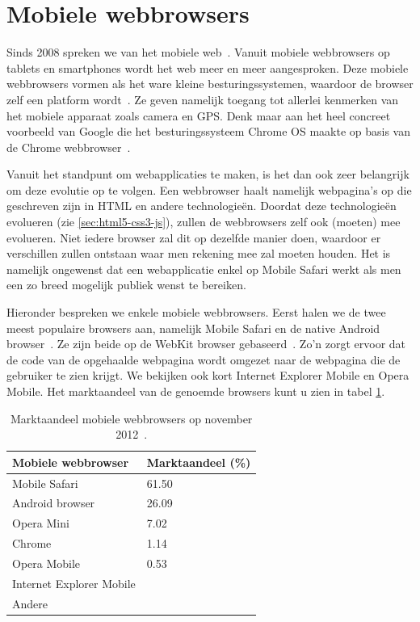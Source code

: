 
\section{Mobiele webbrowsers}
\label{sec:mobiele-webbrowsers}
Sinds 2008 spreken we van het mobiele web~\cite{Hales2012}. Vanuit mobiele webbrowsers op tablets en smartphones wordt het web meer en meer aangesproken. Deze mobiele webbrowsers vormen als het ware kleine besturingssystemen, waardoor de browser zelf een platform wordt~\cite{Hales2012}. Ze geven namelijk toegang tot allerlei kenmerken van het mobiele apparaat zoals camera en GPS. Denk maar aan het heel concreet voorbeeld van Google die het besturingssysteem Chrome OS maakte op basis van de Chrome webbrowser~\cite{Hales2012}.

Vanuit het standpunt om webapplicaties te maken, is het dan ook zeer belangrijk om deze evolutie op te volgen. Een webbrowser haalt namelijk webpagina's op die geschreven zijn in HTML en andere technologieën. Doordat deze technologieën evolueren (zie \ref{sec:html5-css3-js}), zullen de webbrowsers zelf ook (moeten) mee evolueren. Niet iedere browser zal dit op dezelfde manier doen, waardoor er verschillen zullen ontstaan waar men rekening mee zal moeten houden. Het is namelijk ongewenst dat een webapplicatie enkel op Mobile Safari werkt als men een zo breed mogelijk publiek wenst te bereiken. 

Hieronder bespreken we enkele mobiele webbrowsers. Eerst halen we de twee meest populaire browsers aan, namelijk Mobile Safari en de native Android browser~\cite{Hales2012}. Ze zijn beide op de WebKit browser  gebaseerd~\cite{Oeflman2011}. Zo'n  zorgt ervoor dat de code van de opgehaalde webpagina wordt omgezet naar de webpagina die de gebruiker te zien krijgt. We bekijken ook kort Internet Explorer Mobile en Opera Mobile. Het marktaandeel van de genoemde browsers kunt u zien in tabel \ref{tbl:marktaandeel-browsers}.

\begin{table}
\begin{center}
\begin{tabular}{ll}
\hline
\textbf{Mobiele webbrowser} & \textbf{Marktaandeel} (\%) \\
\hline
\hline
Mobile Safari				& 61.50 \\
Android browser				& 26.09 \\
Opera Mini				& 7.02 	\\
Chrome					& 1.14 	\\
Opera Mobile				& 0.53 	\\
Internet Explorer Mobile & 		\\
Andere					& 		\\
\hline
\end{tabular}
\caption{Marktaandeel mobiele webbrowsers op november 2012~\cite{NetApplications2012}.}
\label{tbl:marktaandeel-browsers}
\end{center}
\end{table}

